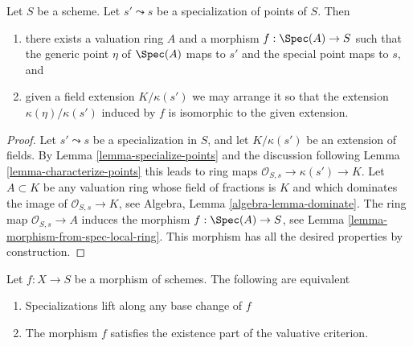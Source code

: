 \begin{lemma}
\label{lemma-points-specialize}
Let $S$ be a scheme. Let $s' \leadsto s$ be a specialization of points of $S$.
Then
\begin{enumerate}
\item there exists a valuation ring $A$ and a morphism
$f : \Spec(A) \to S$ such that the generic point $\eta$ of
$\Spec(A)$ maps to $s'$ and the special point maps to $s$, and
\item given a field extension $K/\kappa(s')$
we may arrange it so that the extension
$\kappa(\eta)/\kappa(s')$ induced by $f$
is isomorphic to the given extension.
\end{enumerate}
\end{lemma}

\begin{proof}
Let $s' \leadsto s$ be a specialization in $S$, and let
$K/\kappa(s')$ be an extension of fields. By
Lemma \ref{lemma-specialize-points}
and the discussion following
Lemma \ref{lemma-characterize-points}
this leads to ring maps $\mathcal{O}_{S, s} \to \kappa(s') \to K$.
Let $A \subset K$ be any valuation ring whose field of fractions is
$K$ and which dominates the image of $\mathcal{O}_{S, s} \to K$, see
Algebra, Lemma \ref{algebra-lemma-dominate}.
The ring map $\mathcal{O}_{S, s} \to A$ induces the morphism
$f : \Spec(A) \to S$, see
Lemma \ref{lemma-morphism-from-spec-local-ring}.
This morphism has all the desired properties by construction.
\end{proof}

\begin{lemma}
\label{lemma-lift-specializations-valuative}
Let $f : X \to S$ be a morphism of schemes.
The following are equivalent
\begin{enumerate}
\item Specializations lift along any base change of $f$
\item The morphism $f$ satisfies the existence part of the
valuative criterion.
\end{enumerate}
\end{lemma}

